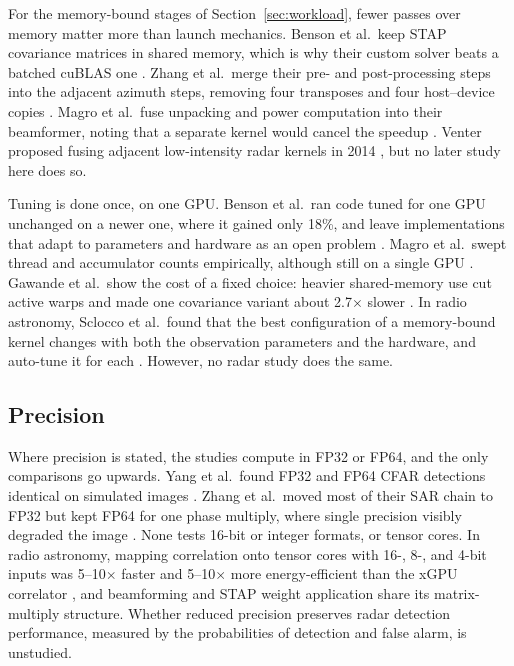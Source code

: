 For the memory-bound stages of Section~\ref{sec:workload}, fewer passes over memory matter more than launch mechanics. Benson et al.\ keep STAP covariance matrices in shared memory, which is why their custom solver beats a batched cuBLAS one \cite{bensonGPUbasedSpacetimeAdaptive2013a}. Zhang et al.\ merge their pre- and post-processing steps into the adjacent azimuth steps, removing four transposes and four host--device copies \cite{zhangNearRealTimeImagingAlgorithm2025a}. Magro et al.\ fuse unpacking and power computation into their beamformer, noting that a separate kernel would cancel the speedup \cite{magroGPUPoweredCoherentBeamforming2014}. Venter proposed fusing adjacent low-intensity radar kernels in 2014 \cite{venterSOFTWAREDEFINEDPULSEDOPPLERRADAR}, but no later study here does so.

Tuning is done once, on one GPU. Benson et al.\ ran code tuned for one GPU unchanged on a newer one, where it gained only 18\%, and leave implementations that adapt to parameters and hardware as an open problem \cite{bensonGPUbasedSpacetimeAdaptive2013a}. Magro et al.\ swept thread and accumulator counts empirically, although still on a single GPU \cite{magroGPUPoweredCoherentBeamforming2014}.
Gawande et al.\ show the cost of a fixed choice:
heavier shared-memory use cut active warps and made one covariance variant about 2.7$\times$ slower \cite{gawandePowerPerformanceTradeoffs2015a}.
In radio astronomy, Sclocco et al.\ found that the best configuration of a memory-bound kernel changes with both the observation parameters and the hardware, and auto-tune it for each \cite{scloccoRealtimeDedispersionFast2016a}. However, no radar study does the same.

\subsection{Precision}
\label{sec:precision}
Where precision is stated, the studies compute in FP32 or FP64, and the only comparisons go upwards. Yang et al.\ found FP32 and FP64 CFAR detections identical on simulated images \cite{yangGPUOrientedDesignsConstant2022a}. Zhang et al.\ moved most of their SAR chain to FP32 but kept FP64 for one phase multiply,  where single precision visibly degraded the image \cite{zhangNearRealTimeImagingAlgorithm2025a}. None tests 16-bit or integer formats, or tensor cores. In radio astronomy, mapping correlation onto tensor cores with 16-, 8-, and 4-bit inputs was 5--10$\times$ faster and 5--10$\times$ more energy-efficient than the xGPU correlator \cite{romeinTensorCoreCorrelator2021a}, and beamforming and STAP weight application share its matrix-multiply structure. Whether reduced precision preserves radar detection performance, measured by the probabilities of detection and false alarm, is unstudied.